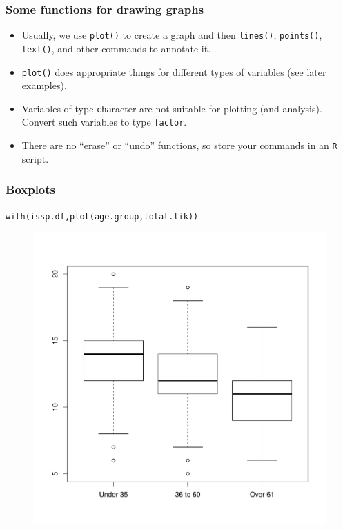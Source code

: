 \documentclass{beamer}\usepackage[]{graphicx}\usepackage[]{color}
\makeatletter
\newcommand{\hlstd}[1]{\textcolor[rgb]{0,0,0}{#1}}%
\newcommand{\hlkwd}[1]{\textcolor[rgb]{0,0.267,0.4}{#1}}%
\newenvironment{kframe}{%
 \def\at@end@of@kframe{}%
 \ifinner\ifhmode%
  \def\at@end@of@kframe{\end{minipage}}%
  \begin{minipage}{\columnwidth}%
 \fi\fi%
 \def\FrameCommand##1{\hskip\@totalleftmargin \hskip-\fboxsep
 \colorbox{shadecolor}{##1}\hskip-\fboxsep
     \hskip-\linewidth \hskip-\@totalleftmargin \hskip\columnwidth}%
 \MakeFramed {\advance\hsize-\width
   \@totalleftmargin\z@ \linewidth\hsize
   \@setminipage}}%
 {\par\unskip\endMakeFramed%
 \at@end@of@kframe}
\newenvironment{knitrout}{}{} %
\makeatother
\begin{document}
\begin{frame}[fragile]
  \frametitle{Some functions for drawing graphs}
  \begin{itemize}
  \item Usually, we use \texttt{plot()} to create a graph and then
    \texttt{lines()}, \texttt{points()}, \texttt{text()}, and other
    commands to annotate it.
  \item \texttt{plot()} does appropriate things for different types of
    variables (see later examples).
  \item Variables of type \texttt{cha}racter are not suitable for plotting (and analysis). Convert such variables to type \texttt{factor}.
  \item There are no ``erase'' or ``undo'' functions, so store your commands in an \texttt{R} script.
  \end{itemize}
\end{frame}


\begin{frame}[fragile]
  \frametitle{Boxplots}
\begin{knitrout}
\color{fgcolor}\begin{kframe}
\begin{alltt}
\hlkwd{with}\hlstd{(issp.df,} \hlkwd{plot}\hlstd{(age.group, total.lik))}
\end{alltt}
\end{kframe}
\end{knitrout}

\begin{figure}[h]
  \vspace{-20pt}
  \centering
  \includegraphics[height = 0.6\textwidth, keepaspectratio]{Figure/box1}
  \label{fig:box1}
\end{figure}
\end{frame}
\end{document}
